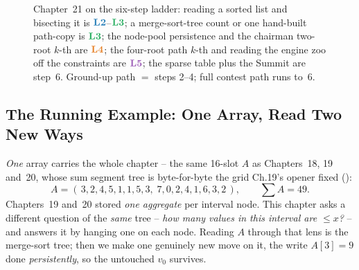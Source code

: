 \begin{figure}[H]
\centering
{}
\caption*{Chapter~21 on the six-step ladder: reading a sorted list and
bisecting it is \(\lv2\)--\(\lv3\); a merge-sort-tree count or one hand-built
path-copy is \(\lv3\); the node-pool persistence and the chairman two-root
\(k\)-th are \(\lv4\); the four-root path \(k\)-th and reading the engine zoo
off the constraints are \(\lv5\); the sparse table plus the Summit are step~6.
Ground-up path \(=\) steps 2--4; full contest path runs to~6.}
\end{figure}

\subsection*{The Running Example: One Array, Read Two New Ways}

\emph{One} array carries the whole chapter -- the same 16-slot \(A\) as
Chapters~18, 19 and~20, whose sum segment tree is byte-for-byte the grid
Ch.19's opener fixed ():
\[
  A=(\,3,2,4,5,1,1,5,3,\;7,0,2,4,1,6,3,2\,),\qquad \textstyle\sum A = 49 .
\]
Chapters~19 and~20 stored \emph{one aggregate} per interval node.  This chapter
asks a different question of the \emph{same} tree -- \emph{how many values in
this interval are \(\le x\)?} -- and answers it by hanging one  on each node.  Reading \(A\) through that lens is the merge-sort tree;
then we make one genuinely new move on it, the write \(A[3]=9\) done
\emph{persistently}, so the untouched \(v_0\) survives.

